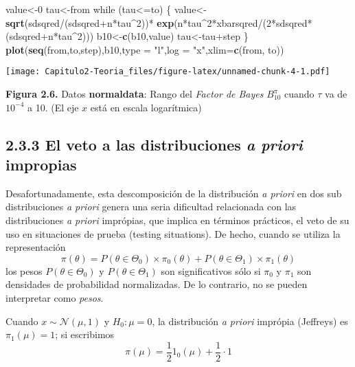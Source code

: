 \documentclass[12pt,]{article}
\newenvironment{Shaded}{\begin{snugshade}}{\end{snugshade}}
\newcommand{\KeywordTok}[1]{\textcolor[rgb]{0.13,0.29,0.53}{\textbf{{#1}}}}
\newcommand{\DataTypeTok}[1]{\textcolor[rgb]{0.13,0.29,0.53}{{#1}}}
\newcommand{\DecValTok}[1]{\textcolor[rgb]{0.00,0.00,0.81}{{#1}}}
\newcommand{\StringTok}[1]{\textcolor[rgb]{0.31,0.60,0.02}{{#1}}}
\newcommand{\NormalTok}[1]{{#1}}
\begin{document}
\begin{Shaded}
\begin{Highlighting}[]
\NormalTok{value<-}\DecValTok{0}
\NormalTok{tau<-from}
\NormalTok{while (tau<=to) \{}
  \NormalTok{value<-}\KeywordTok{sqrt}\NormalTok{(sdsqred/(sdsqred+n*tau^}\DecValTok{2}\NormalTok{))*}
\StringTok{    }\KeywordTok{exp}\NormalTok{(n*tau^}\DecValTok{2}\NormalTok{*xbarsqred/(}\DecValTok{2}\NormalTok{*sdsqred*(sdsqred+n*tau^}\DecValTok{2}\NormalTok{)))}
  \NormalTok{b10<-}\KeywordTok{c}\NormalTok{(b10,value)}
  \NormalTok{tau<-tau+step}
\NormalTok{\}}
\KeywordTok{plot}\NormalTok{(}\KeywordTok{seq}\NormalTok{(from,to,step),b10,}\DataTypeTok{type =} \StringTok{"l"}\NormalTok{,}\DataTypeTok{log =} \StringTok{"x"}\NormalTok{,}\DataTypeTok{xlim=}\KeywordTok{c}\NormalTok{(from, to))}
\end{Highlighting}
\end{Shaded}

\texttt{[image: Capitulo2-Teoria\_files/figure-latex/unnamed-chunk-4-1.pdf]}

\textbf{Figura 2.6.} Datos \textbf{normaldata}: Rango del \emph{Factor
de Bayes} \(B_{10}^\pi\) cuando \(\tau\) va de \(10^{-4}\) a 10. (El eje
\(x\) está en escala logarítmica)

\subsection{\texorpdfstring{2.3.3 El veto a las distribuciones \emph{a
priori}
impropias}{2.3.3 El veto a las distribuciones a priori impropias}}\label{el-veto-a-las-distribuciones-a-priori-impropias}

Desafortunadamente, esta descomposición de la distribución \emph{a
priori} en dos sub distribuciones \emph{a priori} genera una seria
dificultad relacionada con las distribuciones \emph{a priori} imprópias,
que implica en términos prácticos, el veto de su uso en situaciones de
prueba (testing situations). De hecho, cuando se utiliza la
representación \[
\pi(\theta)=P(\theta\in\Theta_0)\times\pi_0(\theta)+P(\theta\in\Theta_1)\times\pi_1(\theta)
\] los pesos \(P(\theta\in\Theta_0)\) y \(P(\theta\in\Theta_1)\) son
significativos sólo si \(\pi_0\) y \(\pi_1\) son densidades de
probabilidad normalizadas. De lo contrario, no se pueden interpretar
como \emph{pesos}.

Cuando \(x\sim\mathcal{N}(\mu,1)\) y \(H_0:\mu=0\), la distribución
\emph{a priori} imprópia (Jeffreys) es \(\pi_1(\mu)=1\); si escribimos
\[
\pi(\mu)=\frac{1}{2} 1_{0}(\mu)+\frac{1}{2} \cdotp 1
\]
\end{document}
